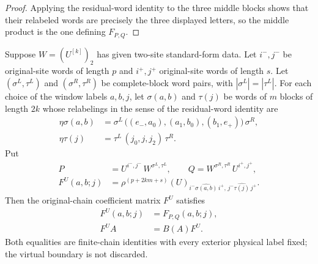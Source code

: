 \begin{proof}\leanok
    Applying the residual-word identity to the three middle blocks shows that their
    relabeled words are precisely the three displayed letters, so the
    middle product is the one defining $F_{P,Q}$.
\end{proof}

\begin{lemma}
    \label{thm:mpu_original_site_buffered_three_block_locality}
    \leanok
    Suppose $W=(U^{[k]})_2$ has given two-site standard-form data.
    Let $i^-,j^-$ be original-site words of length $p$ and $i^+,j^+$
    original-site words of length $s$. Let
    $(\sigma^{L},\tau^{L})$ and $(\sigma^{R},\tau^{R})$ be complete-block
    word pairs, with $|\sigma^{L}|=|\tau^{L}|$. For each choice of the
    window labels $a,b,j$, let $\sigma(a,b)$ and $\tau(j)$ be words of $m$
    blocks of length $2k$ whose relabelings in the sense of the
    residual-word identity are
    \begin{align}
        \eta\sigma(a,b)
         & =\sigma^{L}\,\bigl((e_-,a_0),(a_1,b_0),(b_1,e_+)\bigr)\,
        \sigma^{R},                                                 \\
        \eta\tau(j)
         & =\tau^{L}\,(j_0,j,j_2)\,\tau^{R}.
    \end{align}
    Put
    \begin{align}
        P & =U^{i^-,j^-}\,W^{\sigma^{L},\tau^{L}}, \qquad
        Q=W^{\sigma^{R},\tau^{R}}\,U^{i^+,j^+},                    \\
        F^U(a,b;j)
          & =\rho^{(p+2km+s)}(U)_{i^-\widehat{\sigma(a,b)}\,i^+,\,
                j^-\widehat{\tau(j)}\,j^+}.
    \end{align}
    Then the original-chain coefficient matrix $F^U$ satisfies
    \begin{align}
        F^U(a,b;j) & = F_{P,Q}(a,b;j),
        \label{eq:mpu_orig_coeff_pq}   \\
        F^U A      & = B(A)F^U.
        \label{eq:mpu_orig_coeff_intertwiner}
    \end{align}
    Both equalities are finite-chain identities with every exterior
    physical label fixed; the virtual boundary is not discarded.
\end{lemma}


